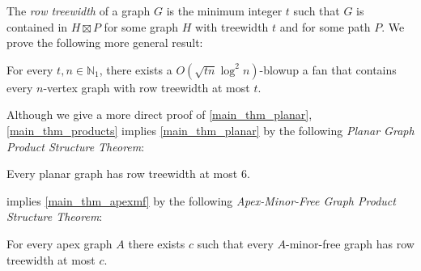 \documentclass{patmorin}
\newcommand{\defin}[1]{\emph{\textcolor{brightmaroon}{#1}}}
\newcommand{\NN}{\mathbb{N}}
\begin{document}

The \defin{row treewidth} of a graph $G$
is the minimum integer $t$ such that $G$ is contained in $H\boxtimes P$ for some graph $H$ with treewidth $t$ and for some path $P$. We prove the following more general result:


\begin{thm}\label{main_thm_products}
    For every $t,n\in\NN_1$, there exists a 
    $O( \sqrt{tn}\log^2 n )$-blowup a fan that contains every $n$-vertex graph with row treewidth at most $t$.
\end{thm}

Although we give a more direct proof of \cref{main_thm_planar}, \cref{main_thm_products} implies \cref{main_thm_planar} by the following \defin{Planar Graph Product Structure Theorem}:

\begin{thm}\label{planar_product_structure}
  Every planar graph has row treewidth at most $6$.
\end{thm}

 implies \cref{main_thm_apexmf} by the following \defin{Apex-Minor-Free Graph Product Structure Theorem}:

\begin{thm}\label{apexmf_product_structure}
  For every apex graph $A$ there exists $c$ such that every $A$-minor-free graph has row treewidth at most $c$.
\end{thm}
\end{document}
